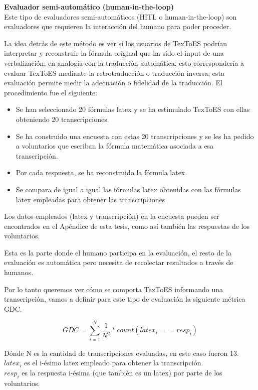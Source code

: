 {\Large \textbf{Evaluador semi-automático (human-in-the-loop)}}\\

Este tipo de evaluadores semi-automáticos (HITL o human-in-the-loop\cite{9}) son evaluadores que requieren la interacción del humano para poder proceder.

La idea detrás de este método es ver si los usuarios de TexToES podrían interpretar y reconstruir la fórmula original que ha sido el input de una verbalización; en analogía con la traducción automática, esto correspondería a evaluar TexToES mediante la retrotraducción o traducción inversa; esta evaluación permite medir la adecuación o fidelidad de la traducción. El procedimiento fue el siguiente:

\begin{itemize}
   \item Se han seleccionado 20 fórmulas latex y se ha estimulado TexToES con ellas obteniendo 20 transcripciones.
   \item Se ha construido una encuesta con estas 20 transcripciones y se les ha pedido a voluntarios que escriban la fórmula matemática asociada a esa transcripción.
   \item Por cada respuesta, se ha reconstruido la fórmula latex.
   \item Se compara de igual a igual las fórmulas latex obtenidas con las fórmulas latex empleadas para obtener las transcripciones
\end{itemize}

Los datos empleados (latex y transcripción) en la encuesta pueden ser encontrados en el Apéndice de esta tesis, como así también las respuestas de los voluntarios.

Esta es la parte donde el humano participa en la evaluación, el resto de la evaluación es automática pero necesita de recolectar resultados a través de humanos.

Por lo tanto queremos ver cómo se comporta TexToES informando una transcripción, vamos a definir para este tipo de evaluación la siguiente métrica GDC.

$$GDC = \sum_{i=1}^{N} \frac{1}{N^2}*count(latex_i==resp_i)$$

Dónde N es la cantidad de transcripciones evaluadas, en este caso fueron 13.\\
$latex_i$ es el i-ésimo latex empleado para obtener la transcripción.\\
$resp_i$ es la respuesta i-ésima (que también es un latex) por parte de los voluntarios.

